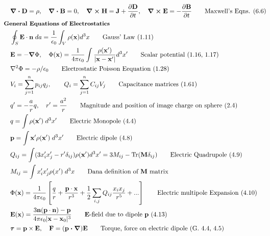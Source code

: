 \documentclass[10pt]{article}
\newcommand{\ve}[1]{\boldsymbol{\mathbf{#1}}}
\newcommand{\vect}[1]{\boldsymbol{\mathbf{#1}}}
\newcommand{\vc}[1]{\mathbf{#1}}
\newcommand{\eo}{\epsilon_0}
\newcommand{\pder}[2]{\frac{\partial #1}{\partial #2}}
\newcommand{\K}{\frac{1}{4 \pi \eo}}
\begin{document}
\begin{multicols}{2}
	\tiny
	\setlength{\abovedisplayskip}{-25pt}
	\setlength{\belowdisplayskip}{0pt}
	\setlength{\abovedisplayshortskip}{0pt}
	\setlength{\belowdisplayshortskip}{0pt}
	\begin{align*}
		& \ve{\nabla \cdot D} = \rho, \quad \ve{\nabla \cdot B} = 0, \quad \ve{\nabla \times H} = \ve{J}+\pder{\ve{D}}{t},\quad \ve{\nabla \times E} = - \pder{\ve{B}}{t} \tag*{Maxwell's Eqns. (6.6)}\\
	& \small \hspace{-10pt} \textbf{General Equations of Electrostatics} \small \\
		& \oint_S \vc{E} \cdot \vc{n} \; da = \frac{1}{\eo} \int_V \rho(\vc{x}) d^3x	\tag*{Gauss' Law (1.11)} \\
		& \ve{E} = -\ve{\nabla} \Phi, \quad \Phi(\vc{x}) = \K \int \frac{\rho (\vc{x}')}{|\vc{x} - \vc{x}'|} d^3 x' \tag*{Scalar potential (1.16, 1.17)} \\
		& \nabla^2 \Phi = -\rho/\eo	\tag*{Electrostatic Poisson Eequation (1.28)} \\
		& V_i = \sum_{j=1}^{n} p_{ij} q_j,  \qquad Q_i = \sum_{j=1}^{n} C_{ij} V_j  \tag*{Capacitance matrices (1.61)} \\
		& q' = -\frac{a}{r} q, \quad r' = \frac{a^2}{r}		\tag*{Magnitude and position of image charge on sphere (2.4)} \\
		& q = \int \rho(\vect{x}') \; d^3x'	\tag*{Electric Monopole (4.4)} \\
		& \vect{p} = \int \vect{x}' \rho(\vect{x}') \; d^3x'	\tag*{Electric dipole (4.8)} \\
		& Q_{ij} = \int (3 x_i' x_j'- r' \delta_{ij})\rho(\vect{x}') d^3x' = 3 M_{ij} - \text{Tr}(\vect{M} \delta_{ij})		\tag*{Electric Quadrupole (4.9)} \\
		& M_{ij} = \int x_i' x_j' \rho(x') \; d^3 x \tag*{Dana definition of $\ve{M}$ matrix} \\
		&\Phi(\vect{x}) = \K \left[ \frac{q}{r} + \frac{ \vect{p} \cdot \vect{x}}{r^3} + \frac{1}{2} \sum_{i,j} Q_{ij} \frac{x_i x_j}{r^5} + ... \right] \tag*{Electric multipole Expansion (4.10)} \\
		& \vect{E}(\vect{x}) = \frac{3 \vect{n}(\vect{p} \cdot \vect{n}) - \vect{p}}{4 \pi \eo |\vect{x} - \vect{x}_0|^3} \tag*{$\vect{E}$-field due to dipole $\vect{p}$ (4.13)} \\
		& \ve{\tau} = \ve{p} \times \ve{E}, \quad \ve{F} = (\ve{p \cdot \nabla}) \ve{E} \tag*{Torque, force on electric dipole (G. 4.4, 4.5)} \\

\end{align*}
\end{multicols}
\end{document}

